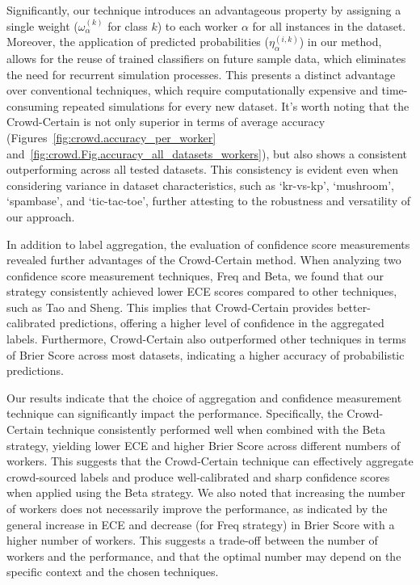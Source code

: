 Significantly, our technique introduces an advantageous property by assigning a single weight ($\omega_{\alpha}^{(k)}$ for class $k$) to each worker $\alpha$ for all instances in the dataset. Moreover, the application of predicted probabilities ($\eta_{\alpha}^{(i,k)}$) in our method, allows for the reuse of trained classifiers on future sample data, which eliminates the need for recurrent simulation processes. This presents a distinct advantage over conventional techniques, which require computationally expensive and time-consuming repeated simulations for every new dataset. It's worth noting that the Crowd-Certain is not only superior in terms of average accuracy (Figures~\ref{fig:crowd.accuracy_per_worker} and~\ref{fig:crowd.Fig.accuracy_all_datasets_workers}), but also shows a consistent outperforming across all tested datasets. This consistency is evident even when considering variance in dataset characteristics, such as `kr-vs-kp', `mushroom', `spambase', and `tic-tac-toe', further attesting to the robustness and versatility of our approach.

In addition to label aggregation, the evaluation of confidence score measurements revealed further advantages of the Crowd-Certain method. When analyzing two confidence score measurement techniques, Freq and Beta, we found that our strategy consistently achieved lower ECE scores compared to other techniques, such as Tao and Sheng. This implies that Crowd-Certain provides better-calibrated predictions, offering a higher level of confidence in the aggregated labels. Furthermore, Crowd-Certain also outperformed other techniques in terms of Brier Score across most datasets, indicating a higher accuracy of probabilistic predictions.

Our results indicate that the choice of aggregation and confidence measurement technique can significantly impact the performance. Specifically, the Crowd-Certain technique consistently performed well when combined with the Beta strategy, yielding lower ECE and higher Brier Score across different numbers of workers. This suggests that the Crowd-Certain technique can effectively aggregate crowd-sourced labels and produce well-calibrated and sharp confidence scores when applied using the Beta strategy. We also noted that increasing the number of workers does not necessarily improve the performance, as indicated by the general increase in ECE and decrease (for Freq strategy) in Brier Score with a higher number of workers. This suggests a trade-off between the number of workers and the performance, and that the optimal number may depend on the specific context and the chosen techniques.

